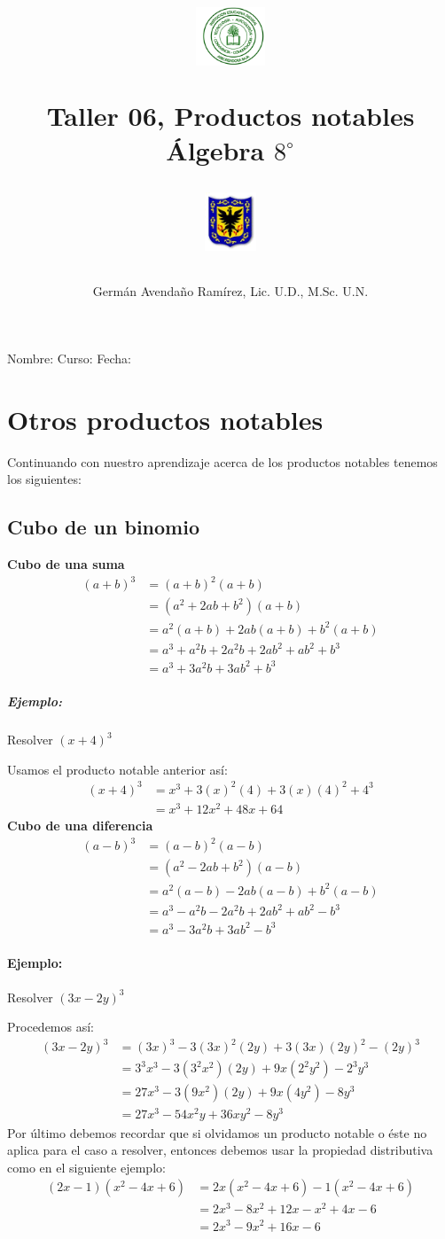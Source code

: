 \documentclass[10pt,twoside]{article}
\author{Germ\'an Avenda\~no Ram\'irez, Lic. U.D., M.Sc. U.N.}
\title{\begin{minipage}{.2\textwidth}
\includegraphics[height=1.75cm]{Images/logo-colegio.png}\end{minipage}
\begin{minipage}{.55\textwidth}
\begin{center}
Taller 06, Productos notables\\
Álgebra $8^{\circ}$
\end{center}
\end{minipage}\hfill
\begin{minipage}{.2\textwidth}
\includegraphics[height=1.75cm]{Images/logo-sed.png} 
\end{minipage}}
\date{}
\begin{document}
\maketitle
Nombre: \hrulefill Curso: \underline{\hspace*{44pt}} Fecha: \underline{\hspace*{2.5cm}}
\section*{Otros productos notables}
Continuando con nuestro aprendizaje acerca de los productos notables tenemos los siguientes:
\subsection*{Cubo de un binomio}
\textbf{Cubo de una suma}
\begin{align*}
(a+b)^{3}&=(a+b)^{2}(a+b)\\
&=(a^{2}+2ab+b^2)(a+b)\\
&=a^2(a+b)+2ab(a+b)+b^2(a+b)\\
&=a^3+a^2b+2a^2b+2ab^2+ab^2+b^3\\
&=a^3+3a^2b+3ab^2+b^3
\end{align*}
\subparagraph*{Ejemplo:} Resolver $(x+4)^3$

Usamos el producto notable anterior así:
\begin{align*}
(x+4)^3&=x^3+3(x)^2(4)+3(x)(4)^2+4^3\\
&=x^{3}+12x^2+48x+64
\end{align*}
\textbf{Cubo de una diferencia}
\begin{align*}
(a-b)^3&=(a-b)^2(a-b)\\
&=(a^2-2ab+b^2)(a-b)\\
&=a^2(a-b)-2ab(a-b)+b^2(a-b)\\
&=a^3-a^2b-2a^2b+2ab^2+ab^2-b^3\\
&=a^3-3a^2b+3ab^2-b^3
\end{align*}
\paragraph*{Ejemplo:}

Resolver $(3x-2y)^3$

Procedemos así:
\begin{align*}
(3x-2y)^3&=(3x)^3-3(3x)^2(2y)+3(3x)(2y)^2-(2y)^3\\
&=3^3x^3-3(3^2x^2)(2y)+9x(2^2y^2)-2^3y^3\\
&=27x^3-3(9x^2)(2y)+9x(4y^2)-8y^3\\
&=27x^3-54x^2y+36xy^2-8y^3
\end{align*}
Por último debemos recordar que si olvidamos un producto notable o éste no aplica para el caso a resolver, entonces debemos usar la propiedad distributiva como en el siguiente ejemplo:
\begin{align*}
(2x-1)(x^2-4x+6)&=2x(x^2-4x+6)-1(x^2-4x+6)\\
&=2x^3-8x^2+12x-x^2+4x-6\\
&=2x^3-9x^2+16x-6
\end{align*}
\end{document}
